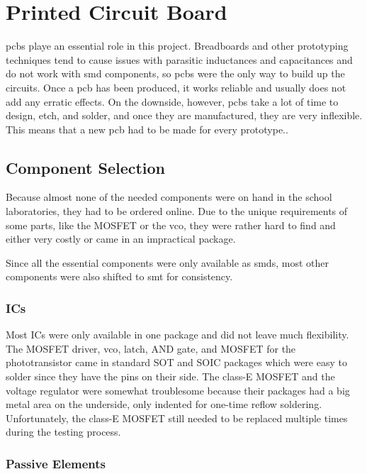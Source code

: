 \chapter{Printed Circuit Board}

\glspl{pcb} playe an essential role in this project. Breadboards and other prototyping techniques tend to cause issues with parasitic inductances and capacitances and do not work with \gls{smd} components, so \glspl{pcb} were the only way to build up the circuits. Once a \gls{pcb} has been produced, it works reliable and usually does not add any erratic effects. On the downside, however, \glspl{pcb} take a lot of time to design, etch, and solder, and once they are manufactured, they are very inflexible. This means that a new \gls{pcb} had to be made for every prototype..

\section{Component Selection}

Because almost none of the needed components were on hand in the school laboratories, they had to be ordered online. Due to the unique requirements of some parts, like the MOSFET or the \gls{vco}, they were rather hard to find and either very costly or came in an impractical package.

Since all the essential components were only available as \glspl{smd}, most other components were also shifted to \gls{smt} for consistency.


\subsection{ICs}

Most ICs were only available in one package and did not leave much flexibility. The MOSFET driver, \gls{vco}, latch, AND gate, and MOSFET for the phototransistor came in standard SOT and SOIC packages which were easy to solder since they have the pins on their side. The class-E MOSFET and the voltage regulator were somewhat troublesome because their packages had a big metal area on the underside, only indented for one-time reflow soldering. Unfortunately, the class-E MOSFET still needed to be replaced multiple times during the testing process.

\subsection{Passive Elements}

